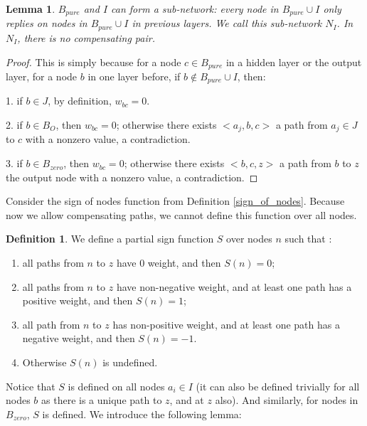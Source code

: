 \documentclass[]{article}
\newtheorem{lemma}{Lemma}
\theoremstyle{definition}
\newtheorem{definition}{Definition}
\begin{document}
			\begin{lemma}\label{lem:subnetwork}
				$B_{pure}$ and $I$ can form a sub-network: every node in $B_{pure}\cup I$ only replies on nodes in $B_{pure}\cup I$ in previous layers. We call this sub-network $N_I$. In $N_I$, there is no compensating pair.
			\end{lemma}
			
			\begin{proof}
				This is simply because for a node $c\in B_{pure}$ in a hidden layer or the output layer, for a node $b$ in one layer before, if $b\notin B_{pure}\cup I$, then:
				
				1. if $b\in J$, by definition, $w_{bc}=0$.
				
				2. if $b\in B_{O}$, then $w_{bc}=0$; otherwise there exists $<a_j,b,c>$ a path from $a_j\in J$ to $c$ with a nonzero value, a contradiction.
				
				3. if $b\in B_{zero}$, then $w_{bc}=0$; otherwise there exists $<b,c,z>$ a path from $b$ to $z$ the output node with a nonzero value, a contradiction.
			\end{proof}
			
			
			
			Consider the sign of nodes function from Definition \ref{sign_of_nodes}. Because now we allow compensating paths, we cannot define this function over all nodes.
			
			
			
			
			\begin{definition}\label{sign_of_nodes_in_I_2}
				We define a partial sign function $S$ over nodes $n$ such that : 	
				\begin{enumerate} 
					\item all paths from $n$ to $z$ have 0 weight, and then $S(n)=0$; 
					\item all paths from $n$ to $z$ have non-negative weight, and at least one path has a positive weight, and then $S(n)=1$; 
					\item all path from $n$ to $z$ has non-positive weight, and at least one path has a negative weight, and then $S(n)=-1$.
					\item Otherwise $S(n)$ is undefined.
				\end{enumerate}
			\end{definition}	
			
			Notice that $S$ is defined on all nodes $a_i \in I$ (it can also be defined trivially for all nodes $b$ as there is a unique path to $z$, and at $z$ also). And similarly, for nodes in  $B_{zero}$, $S$ is defined. We introduce the following lemma:
			
\end{document}
